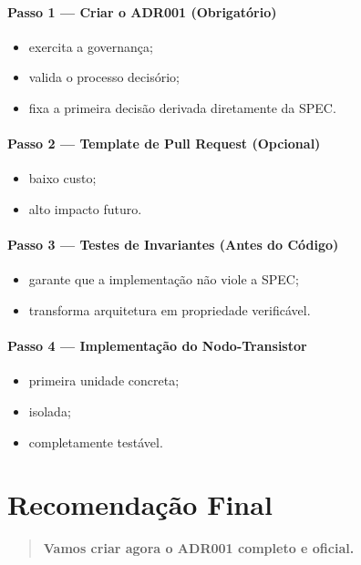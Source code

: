 \documentclass[12pt,a4paper]{article}
\begin{document}
	\paragraph{Passo 1 — Criar o ADR001 (Obrigatório)}
	\begin{itemize}[leftmargin=2em]
		\item exercita a governança;
		\item valida o processo decisório;
		\item fixa a primeira decisão derivada diretamente da SPEC.
	\end{itemize}
	
	\paragraph{Passo 2 — Template de Pull Request (Opcional)}
	\begin{itemize}[leftmargin=2em]
		\item baixo custo;
		\item alto impacto futuro.
	\end{itemize}
	
	\paragraph{Passo 3 — Testes de Invariantes (Antes do Código)}
	\begin{itemize}[leftmargin=2em]
		\item garante que a implementação não viole a SPEC;
		\item transforma arquitetura em propriedade verificável.
	\end{itemize}
	
	\paragraph{Passo 4 — Implementação do Nodo-Transistor}
	\begin{itemize}[leftmargin=2em]
		\item primeira unidade concreta;
		\item isolada;
		\item completamente testável.
	\end{itemize}
	
	\section{Recomendação Final}
	
	\begin{quote}
		\textbf{Vamos criar agora o ADR001 completo e oficial.}
	\end{quote}
	
\end{document}
